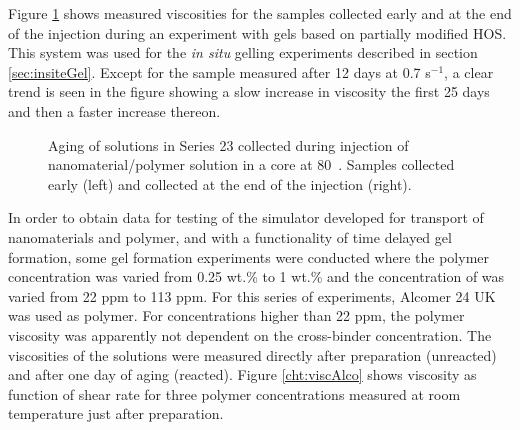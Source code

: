 \documentclass[nanomaterials,article,submit,moreauthors,pdftex]{Definitions/mdpi}
\begin{document}
Figure \ref{cht:s23visc80} shows measured viscosities for the samples collected early and at the end of the injection during an experiment with gels based on partially modified HOS.
This system was used for the \textit{in situ} gelling experiments described in section \ref{sec:insiteGel}. Except for the sample measured after 12 days at 0.7 s$^{-1}$, a clear trend is seen in the figure showing a slow increase in viscosity the first 25 days and then a faster increase thereon.

\begin{figure}[h!] 
    \centering
    \caption{Aging of solutions in Series 23 collected during injection of nanomaterial/polymer solution in a core at 80~\celsius. Samples collected early (left) and collected at the end of the injection (right).}
    \label{cht:s23visc80}
\end{figure} 

In order to obtain data for testing of the simulator developed for transport of nanomaterials and polymer, and with a functionality of time delayed gel formation, some gel formation experiments were conducted where the polymer concentration was varied from 0.25 wt.\% to 1 wt.\% and the concentration of  was varied from 22 ppm to 113 ppm. For this series of experiments, Alcomer 24 UK was used as polymer. For concentrations higher than 22 ppm, the polymer viscosity was apparently not dependent on the cross-binder concentration. The viscosities of the solutions were measured directly after preparation (unreacted) and after one day of aging (reacted). Figure \ref{cht:viscAlco} shows viscosity as function of shear rate for three polymer concentrations measured at room temperature just after preparation.
\end{document}
